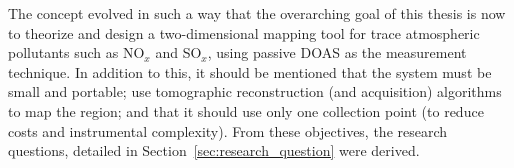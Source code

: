 The concept evolved in such a way that the  overarching goal of this
thesis is now to theorize and design a two-dimensional mapping tool for
trace atmospheric pollutants such as NO$_x$ and SO$_x$, using passive
DOAS as the measurement technique. In addition to this, it should be
mentioned that the system must be small and portable; use tomographic
reconstruction (and acquisition) algorithms to map the region; and that
it should use only one collection point (to reduce costs and
instrumental complexity). From these objectives, the research questions,
detailed in Section~\ref{sec:research_question} were derived.



